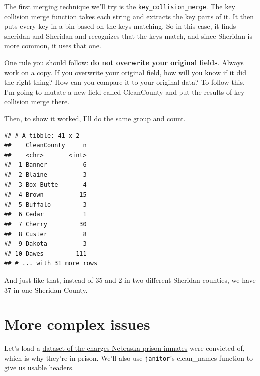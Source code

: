 \documentclass[]{book}
\newenvironment{Shaded}{\begin{snugshade}}{\end{snugshade}}
\newcommand{\DataTypeTok}[1]{\textcolor[rgb]{0.13,0.29,0.53}{#1}}
\newcommand{\KeywordTok}[1]{\textcolor[rgb]{0.13,0.29,0.53}{\textbf{#1}}}
\newcommand{\NormalTok}[1]{#1}
\newcommand{\OperatorTok}[1]{\textcolor[rgb]{0.81,0.36,0.00}{\textbf{#1}}}
\newcommand{\StringTok}[1]{\textcolor[rgb]{0.31,0.60,0.02}{#1}}
\begin{document}
The first merging technique we'll try is the \texttt{key\_collision\_merge}. The key collision merge function takes each string and extracts the key parts of it. It then puts every key in a bin based on the keys matching. So in this case, it finds sheridan and Sheridan and recognizes that the keys match, and since Sheridan is more common, it uses that one.

One rule you should follow: \textbf{do not overwrite your original fields}. Always work on a copy. If you overwrite your original field, how will you know if it did the right thing? How can you compare it to your original data? To follow this, I'm going to mutate a new field called CleanCounty and put the results of key collision merge there.

Then, to show it worked, I'll do the same group and count.

\begin{Shaded}
\end{Shaded}

\begin{verbatim}
## # A tibble: 41 x 2
##    CleanCounty     n
##    <chr>       <int>
##  1 Banner          6
##  2 Blaine          3
##  3 Box Butte       4
##  4 Brown          15
##  5 Buffalo         3
##  6 Cedar           1
##  7 Cherry         30
##  8 Custer          8
##  9 Dakota          3
## 10 Dawes         111
## # ... with 31 more rows
\end{verbatim}

And just like that, instead of 35 and 2 in two different Sheridan counties, we have 37 in one Sheridan County.

\hypertarget{more-complex-issues}{%
\section{More complex issues}\label{more-complex-issues}}

Let's load a \href{https://unl.box.com/s/7vs5ycscmzg3bnxhxqdv7aegill2gz2z}{dataset of the charges Nebraska prison inmates} were convicted of, which is why they're in prison. We'll also use \texttt{janitor}'s clean\_names function to give us usable headers.
\end{document}
